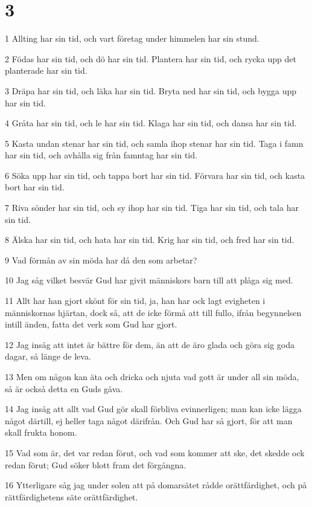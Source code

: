 \chapter{3}

\par 1 Allting har sin tid, och vart företag under himmelen har sin stund.
\par 2 Födas har sin tid, och dö har sin tid. Plantera har sin tid, och rycka upp det planterade har sin tid.
\par 3 Dräpa har sin tid, och läka har sin tid. Bryta ned har sin tid, och bygga upp har sin tid.
\par 4 Gråta har sin tid, och le har sin tid. Klaga har sin tid, och dansa har sin tid.
\par 5 Kasta undan stenar har sin tid, och samla ihop stenar har sin tid. Taga i famn har sin tid, och avhålla sig från famntag har sin tid.
\par 6 Söka upp har sin tid, och tappa bort har sin tid. Förvara har sin tid, och kasta bort har sin tid.
\par 7 Riva sönder har sin tid, och sy ihop har sin tid. Tiga har sin tid, och tala har sin tid.
\par 8 Älska har sin tid, och hata har sin tid. Krig har sin tid, och fred har sin tid.
\par 9 Vad förmån av sin möda har då den som arbetar?
\par 10 Jag såg vilket besvär Gud har givit människors barn till att plåga sig med.
\par 11 Allt har han gjort skönt för sin tid, ja, han har ock lagt evigheten i människornas hjärtan, dock så, att de icke förmå att till fullo, ifrån begynnelsen intill änden, fatta det verk som Gud har gjort.
\par 12 Jag insåg att intet är bättre för dem, än att de äro glada och göra sig goda dagar, så länge de leva.
\par 13 Men om någon kan äta och dricka och njuta vad gott är under all sin möda, så är också detta en Guds gåva.
\par 14 Jag insåg att allt vad Gud gör skall förbliva evinnerligen; man kan icke lägga något därtill, ej heller taga något därifrån. Och Gud har så gjort, för att man skall frukta honom.
\par 15 Vad som är, det var redan förut, och vad som kommer att ske, det skedde ock redan förut; Gud söker blott fram det förgångna.
\par 16 Ytterligare såg jag under solen att på domarsätet rådde orättfärdighet, och på rättfärdighetens säte orättfärdighet.
